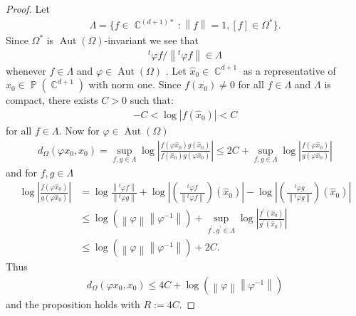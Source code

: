 \documentclass[12pt]{amsart}
\theoremstyle{plain}
\theoremstyle{definition}
\theoremstyle{remark}
\begin{document}
\begin{proof}
Let 
\begin{align*}
\Lambda = \{ f \in \operatorname{\mathbb{C}}^{(d+1)*} : {\left\|{f}\right\|}=1, [f] \in \Omega^*\}.
\end{align*}
Since $\Omega^*$ is $\operatorname{Aut}(\Omega)$-invariant we see that 
\begin{align*}
^t\varphi f/{\left\|{^t\varphi f}\right\|} \in \Lambda
\end{align*}
whenever $f \in \Lambda$ and $\varphi \in \operatorname{Aut}(\Omega)$ . Let $\hat{x}_0 \in \operatorname{\mathbb{C}}^{d+1}$ as a representative of $x_0 \in \operatorname{\mathbb{P}}(\operatorname{\mathbb{C}}^{d+1})$ with norm one. Since $f(x_0) \neq 0$ for all $f \in \Lambda$ and $\Lambda$ is compact,  there exists $C >0$ such that: 
\begin{align*}
-C < \log {\left|{f(\hat{x}_0)}\right|} < C
\end{align*}
 for all $f \in \Lambda$. Now for $\varphi \in \operatorname{Aut}(\Omega)$
 \begin{align*}
 d_{\Omega}(\varphi x_0, x_0) 
 = \sup_{f,g \in \Lambda} \log {\left|{\frac{f(\varphi \hat{x}_0) g(\hat{x}_0)}{f(\hat{x}_0)g(\varphi \hat{x}_0)}}\right|} 
  \leq 2C + \sup_{f,g \in \Lambda} \log {\left|{\frac{f(\varphi \hat{x}_0)}{g(\varphi \hat{x}_0)}}\right|}
 \end{align*}
 and for $f,g \in \Lambda$
 \begin{align*}
\log {\left|{\frac{f(\varphi \hat{x}_0)}{g(\varphi \hat{x}_0)}}\right|}
&=\log \frac{{\left\|{ ^t\varphi f}\right\|}}{{\left\|{^t\varphi g}\right\|}}+\log {\left|{ \left(\frac{^t\varphi f}{{\left\|{^t\varphi f}\right\|}}\right)(\hat{x}_0)}\right|}-\log {\left|{ \left(\frac{^t\varphi g}{{\left\|{^t\varphi g}\right\|}}\right)(\hat{x}_0)}\right|} \\
& \leq \log\left({\left\|{\varphi}\right\|}{\left\|{\varphi^{-1}}\right\|}\right)+\sup_{f^\prime,g^\prime \in \Lambda} \log {\left|{\frac{f^\prime(\hat{x}_0)}{g^\prime(\hat{x}_0)}}\right|} \\
& \leq \log\left({\left\|{\varphi}\right\|}{\left\|{\varphi^{-1}}\right\|}\right)+2C.
 \end{align*}
Thus 
\begin{align*}
d_{\Omega}(\varphi x_0, x_0) \leq 4C + \log\left({\left\|{\varphi}\right\|}{\left\|{\varphi^{-1}}\right\|}\right)
\end{align*}
and the proposition holds with $R:=4C$.
 \end{proof}
\end{document}
